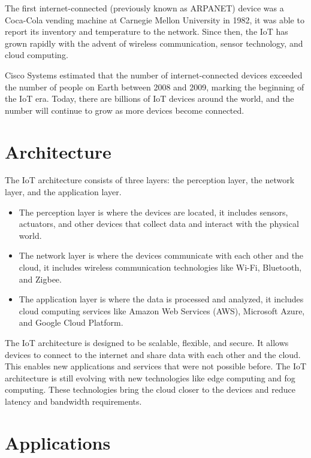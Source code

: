 The first internet-connected (previously known as ARPANET) device was a Coca-Cola vending machine at Carnegie Mellon
University in 1982,\cite{cscmuedu} it was able to report its inventory and temperature to the network. Since then,
the IoT has grown rapidly with the advent of wireless communication, sensor technology, and cloud computing.

Cisco Systems estimated that the number of internet-connected devices exceeded the number of people on Earth between
2008 and 2009,\cite{evans-2011} marking the beginning of the IoT era. Today, there are billions of IoT devices around
the world, and the number will continue to grow as more devices become connected.

\section{Architecture}
\label{sec:iot-architecture}

The IoT architecture consists of three layers: the perception layer, the network layer, and the application layer.
\begin{itemize}
	\item The perception layer is where the devices are located, it includes sensors, actuators, and other devices that
	      collect data and interact with the physical world.
	\item The network layer is where the devices communicate with each other and the cloud, it includes wireless
	      communication technologies like Wi-Fi, Bluetooth, and Zigbee.
	\item The application layer is where the data is processed and analyzed, it includes cloud computing services like
	      Amazon Web Services (AWS), Microsoft Azure, and Google Cloud Platform.
\end{itemize}

The IoT architecture is designed to be scalable, flexible, and secure. It allows devices to connect to the internet and
share data with each other and the cloud. This enables new applications and services that were not possible before. The
IoT architecture is still evolving with new technologies like edge computing and fog computing. These technologies bring
the cloud closer to the devices and reduce latency and bandwidth requirements.

\section{Applications}
\label{sec:iot-applications}

